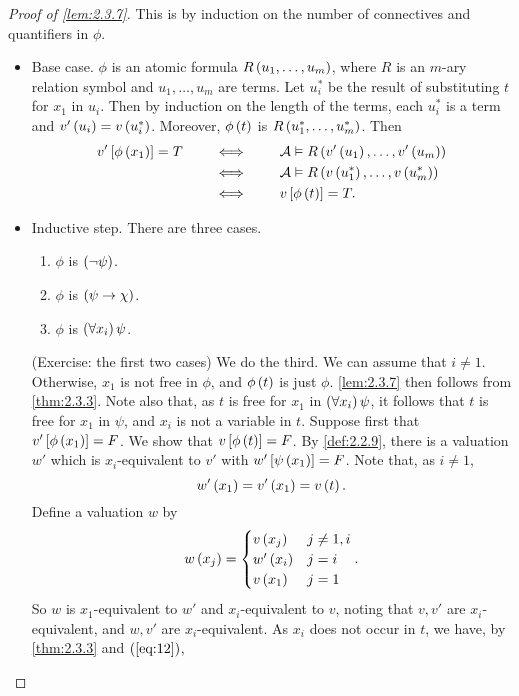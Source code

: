 \begin{proof}[Proof of \ref{lem:2.3.7}]
This is by induction on the number of connectives and quantifiers in $ \phi $.
\begin{itemize}
\item Base case. $ \phi $ is an atomic formula $ R\left( u_1, \dots, u_m \right) $, where $ R $ is an $ m $-ary relation symbol and $ u_1, \dots, u_m $ are terms. Let $ u^*_i $ be the result of substituting $ t $ for $ x_1 $ in $ u_i $. Then by induction on the length of the terms, each $ u_i^* $ is a term and $ v'\left( u_i \right) = v\left( u_i^* \right) $. Moreover, $ \phi\left( t \right) $ is $ R\left( u_1^*, \dots, u_m^* \right) $. Then
\begin{align*}
v'\left[ \phi\left( x_1 \right) \right] = T \qquad
& \iff \qquad \mathcal{A} \vDash R\left( v'\left( u_1 \right), \dots, v'\left( u_m \right) \right) \\
& \iff \qquad \mathcal{A} \vDash R\left( v\left( u_1^* \right), \dots, v\left( u_m^* \right) \right) \\
& \iff \qquad v\left[ \phi\left( t \right) \right] = T.
\end{align*}
\item Inductive step. There are three cases.
\begin{enumerate}[leftmargin=0.5in, label=Case \arabic*.]
\item $ \phi $ is $ \left( \neg \psi \right) $.
\item $ \phi $ is $ \left( \psi \rightarrow \chi \right) $.
\item $ \phi $ is $ \left( \forall x_i \right)\psi $.
\end{enumerate}
(Exercise: the first two cases) We do the third. We can assume that $ i \ne 1 $. Otherwise, $ x_1 $ is not free in $ \phi $, and $ \phi\left( t \right) $ is just $ \phi $. \ref{lem:2.3.7} then follows from \ref{thm:2.3.3}. Note also that, as $ t $ is free for $ x_1 $ in $ \left( \forall x_i \right)\psi $, it follows that $ t $ is free for $ x_1 $ in $ \psi $, and $ x_i $ is not a variable in $ t $. Suppose first that $ v'\left[ \phi\left( x_1 \right) \right] = F $. We show that $ v\left[ \phi\left( t \right) \right] = F $. By \ref{def:2.2.9}, there is a valuation $ w' $ which is $ x_i $-equivalent to $ v' $ with $ w'\left[ \psi\left( x_1 \right) \right] = F $. Note that, as $ i \ne 1 $,
\begin{equation}
\label{eq:12}
w'\left( x_1 \right) = v'\left( x_1 \right) = v\left( t \right).
\end{equation}
Define a valuation $ w $ by
$$ w\left( x_j \right) =
\begin{cases}
v\left( x_j \right) & j \ne 1, i \\
w'\left( x_i \right) & j = i \\
v\left( x_1 \right) & j = 1
\end{cases}.
$$
So $ w $ is $ x_1 $-equivalent to $ w' $ and $ x_i $-equivalent to $ v $, noting that $ v, v' $ are $ x_i $-equivalent, and $ w, v' $ are $ x_i $-equivalent. As $ x_i $ does not occur in $ t $, we have, by \ref{thm:2.3.3} and $ \left( \ref{eq:12} \right) $,

\end{itemize}
\end{proof}

